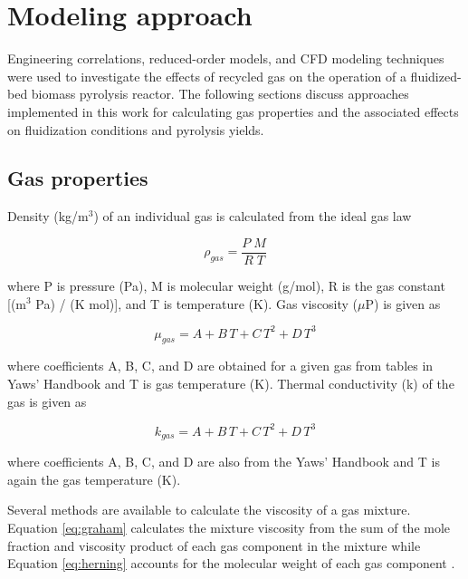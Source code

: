 
\section{Modeling approach}

Engineering correlations, reduced-order models, and CFD modeling techniques were used to investigate the effects of recycled gas on the operation of a fluidized-bed biomass pyrolysis reactor. The following sections discuss approaches implemented in this work for calculating gas properties and the associated effects on fluidization conditions and pyrolysis yields.

\subsection{Gas properties}

Density (kg/m$^3$) of an individual gas is calculated from the ideal gas law

\begin{equation}
    \rho_{gas} = \frac{P\;M}{R\;T}
\end{equation}

\noindent where P is pressure (Pa), M is molecular weight (g/mol), R is the gas constant [(m$^3$ Pa) / (K mol)], and T is temperature (K). Gas viscosity ($\mu$P) is given as

\begin{equation}
    \mu_{gas} = A + B\,T + C\,T^2 + D\,T^3
\end{equation}

\noindent where coefficients A, B, C, and D are obtained for a given gas from tables in Yaws' Handbook and T is gas temperature (K). Thermal conductivity (k) of the gas is given as

\begin{equation}
    k_{gas} = A + B\,T + C\,T^2 + D\,T^3
\end{equation}

\noindent where coefficients A, B, C, and D are also from the Yaws' Handbook and T is again the gas temperature (K).

Several methods are available to calculate the viscosity of a gas mixture. Equation \ref{eq:graham} calculates the mixture viscosity from the sum of the mole fraction and viscosity product of each gas component in the mixture \cite{Graham-1846} while Equation \ref{eq:herning} accounts for the molecular weight of each gas component \cite{Herning-1936}.

